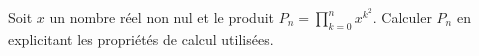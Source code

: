 %
%
	Soit $x$ un nombre réel non nul et le produit $P_n = \prod\limits_{k=0}^{n}x^{k^2}$. Calculer $P_n$ en explicitant les propriétés de calcul utilisées.

